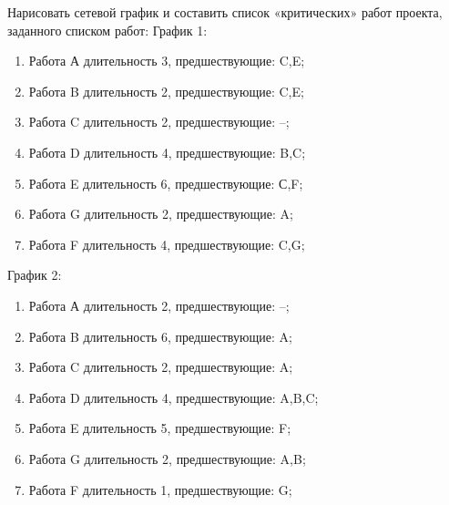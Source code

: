 \question
Нарисовать сетевой график и составить список «критических»
работ проекта, заданного списком работ:
График 1:
\begin{enumerate}
\item  Работа А длительность 3, предшествующие: C,E;
\item  Работа B длительность 2, предшествующие: C,E;
\item  Работа C длительность 2, предшествующие: --;
\item  Работа D длительность 4, предшествующие: B,C;
\item  Работа E длительность 6, предшествующие: С,F;
\item  Работа G длительность 2, предшествующие: A;
\item  Работа F длительность 4, предшествующие: C,G;
\end{enumerate}
График 2:
\begin{enumerate}
\item  Работа А длительность 2, предшествующие: --;
\item  Работа B длительность 6, предшествующие: A;
\item  Работа C длительность 2, предшествующие: A;
\item  Работа D длительность 4, предшествующие: A,B,C;
\item  Работа E длительность 5, предшествующие: F;
\item  Работа G длительность 2, предшествующие: A,B;
\item  Работа F длительность 1, предшествующие: G;
\end{enumerate}